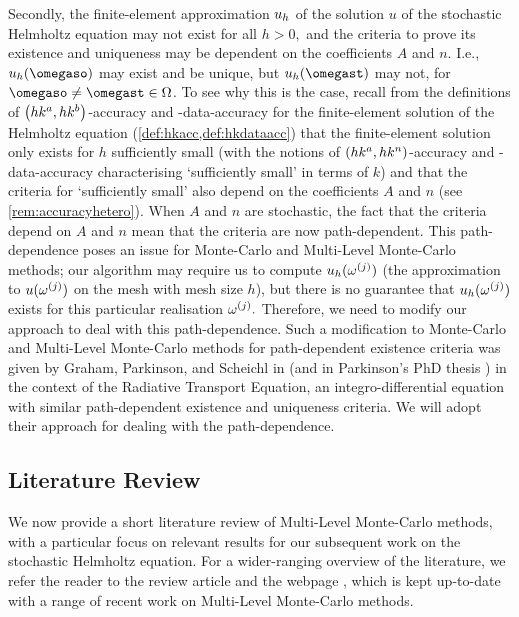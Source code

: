 Secondly, the finite-element approximation $u_{h}$ of the solution $u$ of the stochastic Helmholtz equation may not exist for all $h > 0,$ and the criteria to prove its existence and uniqueness may be dependent on the coefficients $A$ and $n.$ I.e., $\uh(\omegaso)$ may exist and be unique, but $\uh(\omegast)$ may not, for $\omegaso\neq\omegast\in\Omega$. To see why this is the case, recall from the definitions of $\hk{a}{b}$-accuracy and -data-accuracy for the finite-element solution of the Helmholtz equation (\cref{def:hkacc,def:hkdataacc}) that the finite-element solution only exists for $h$ sufficiently small (with the notions of $\hk{a}{n}$-accuracy and -data-accuracy characterising `sufficiently small' in terms of $k$) and that the criteria for `sufficiently small' also depend on the coefficients $A$ and $n$ (see \cref{rem:accuracyhetero}). When $A$ and $n$ are stochastic, the fact that the criteria depend on $A$ and $n$ mean that the criteria are now path-dependent. This path-dependence poses an issue for Monte-Carlo and Multi-Level Monte-Carlo methods; our algorithm may require us to compute $u_{h}(\omega^{(j)})$ (the approximation to $u(\omega^{(j)})$ on the mesh with mesh size $h$), but there is no guarantee that $u_{h}(\omega^{(j)})$ exists for this particular realisation $\omega^{(j)}.$ Therefore, we need to modify our approach to deal with this path-dependence. Such a modification to Monte-Carlo and Multi-Level Monte-Carlo methods for path-dependent existence criteria was given by Graham, Parkinson, and Scheichl in \cite{GrPaSc:19} (and in Parkinson's PhD thesis \cite{Pa:18}) in the context of the Radiative Transport Equation, an integro-differential equation with similar path-dependent existence and uniqueness criteria. We will adopt their approach for dealing with the path-dependence.

\subsection{Literature Review}
We now provide a short literature review of Multi-Level Monte-Carlo methods, with a particular focus on relevant results for our subsequent work on the stochastic Helmholtz equation. For a wider-ranging overview of the literature, we refer the reader to the review article \cite{Gi:15} and the webpage \cite{Gi}, which is kept up-to-date with a range of recent work on Multi-Level Monte-Carlo methods.

